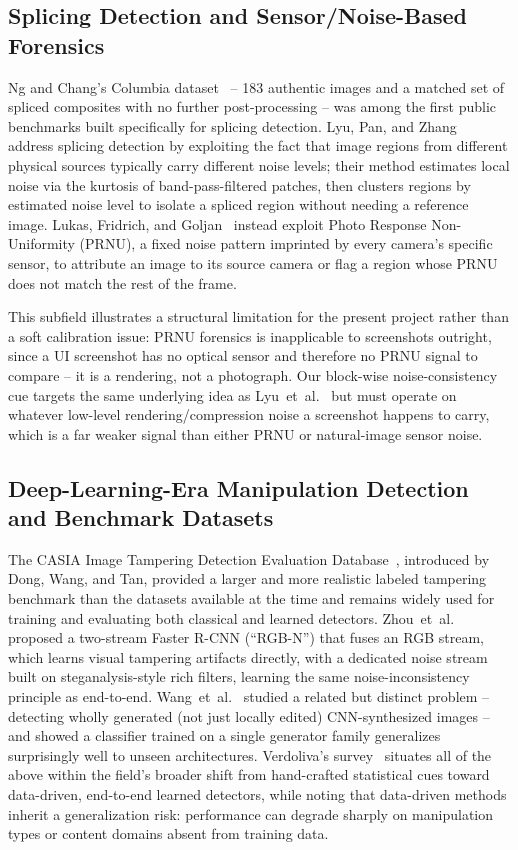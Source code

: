 \documentclass[conference]{IEEEtran}
\begin{document}
\subsection{Splicing Detection and Sensor/Noise-Based Forensics}
Ng and Chang's Columbia dataset~\cite{ng2004columbia} -- 183 authentic images
and a matched set of spliced composites with no further post-processing --
was among the first public benchmarks built specifically for splicing
detection. Lyu, Pan, and Zhang~\cite{lyu2014exposing} address splicing
detection by exploiting the fact that image regions from different physical
sources typically carry different noise levels; their method estimates local
noise via the kurtosis of band-pass-filtered patches, then clusters regions
by estimated noise level to isolate a spliced region without needing a
reference image. Lukas, Fridrich, and Goljan~\cite{lukas2006digital} instead
exploit Photo Response Non-Uniformity (PRNU), a fixed noise pattern imprinted
by every camera's specific sensor, to attribute an image to its source camera
or flag a region whose PRNU does not match the rest of the frame.

This subfield illustrates a structural limitation for the present project
rather than a soft calibration issue: PRNU forensics is inapplicable to
screenshots outright, since a UI screenshot has no optical sensor and
therefore no PRNU signal to compare -- it is a rendering, not a photograph.
Our block-wise noise-consistency cue targets the same underlying idea as
Lyu~et~al.~\cite{lyu2014exposing} but must operate on whatever low-level
rendering/compression noise a screenshot happens to carry, which is a far
weaker signal than either PRNU or natural-image sensor noise.

\subsection{Deep-Learning-Era Manipulation Detection and Benchmark Datasets}
The CASIA Image Tampering Detection Evaluation Database~\cite{dong2013casia},
introduced by Dong, Wang, and Tan, provided a larger and more realistic
labeled tampering benchmark than the datasets available at the time and
remains widely used for training and evaluating both classical and learned
detectors. Zhou~et~al.~\cite{zhou2018learning} proposed a two-stream Faster
R-CNN (``RGB-N'') that fuses an RGB stream, which learns visual tampering
artifacts directly, with a dedicated noise stream built on steganalysis-style
rich filters, learning the same noise-inconsistency principle as
\cite{lyu2014exposing} end-to-end. Wang~et~al.~\cite{wang2020cnngenerated}
studied a related but distinct problem -- detecting wholly generated (not
just locally edited) CNN-synthesized images -- and showed a classifier
trained on a single generator family generalizes surprisingly well to unseen
architectures. Verdoliva's survey~\cite{verdoliva2020media} situates all of
the above within the field's broader shift from hand-crafted statistical
cues toward data-driven, end-to-end learned detectors, while noting that
data-driven methods inherit a generalization risk: performance can degrade
sharply on manipulation types or content domains absent from training data.
\end{document}
